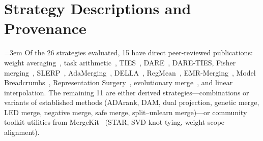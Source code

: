 \documentclass[10pt,letterpaper]{article}
\begin{document}
\section{Strategy Descriptions and Provenance}\label{app:strategies}

\begingroup\emergencystretch=3em
Of the 26 strategies evaluated, 15 have direct peer-reviewed publications: weight averaging~\cite{wortsman2022model}, task arithmetic~\cite{ilharco2023editing}, TIES~\cite{yadav2023ties}, DARE~\cite{yu2024dare}, DARE-TIES, Fisher merging~\cite{matena2022merging}, SLERP~\cite{shoemake1985animating}, AdaMerging~\cite{yang2024adamerging}, DELLA~\cite{deep2024della}, RegMean~\cite{jin2023regmean}, EMR-Merging~\cite{huang2024emr}, Model Breadcrumbs~\cite{davari2024breadcrumbs}, Representation Surgery~\cite{yang2024surgery}, evolutionary merge~\cite{akiba2025evolutionary}, and linear interpolation.
The remaining 11 are either derived strategies---combinations or variants of established methods (ADArank, DAM, dual projection, genetic merge, LED merge, negative merge, safe merge, split--unlearn merge)---or community toolkit utilities from MergeKit~\cite{goddard2024mergekit} (STAR, SVD knot tying, weight scope alignment).
\end{document}
